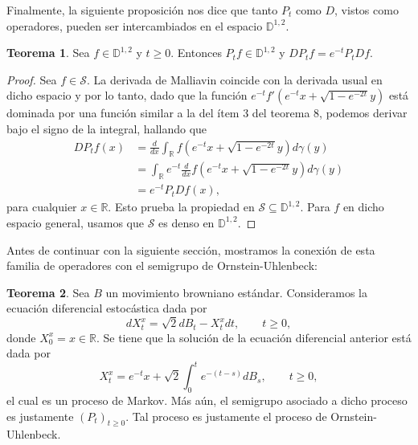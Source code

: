 \documentclass[letterpaper,twoside,12pt]{book}
\newcommand{\R}{\mathbb{R}}
\newcommand{\D}{\mathbb{D}}
\renewcommand{\S}{\mathcal{S}}
\newcommand{\1}{\mathds{1}}
\theoremstyle{definition}
\theoremstyle{definition}
\newtheorem{teo}{Teorema}
\theoremstyle{definition}
\theoremstyle{definition}
\theoremstyle{definition}
\theoremstyle{definition}
\theoremstyle{definition}
\begin{document}
 Finalmente, la siguiente proposición nos dice que tanto $P_t$ como $D$, vistos como operadores, pueden ser intercambiados en el espacio $\mathbb{D}^{1,2}$.
 \begin{teo} 
  Sea $f\in \D^{1,2}$ y $t\geq0$. Entonces $P_tf\in \D^{1,2}$ y $DP_tf=e^{-t}P_tDf$.
  \end{teo}
  \begin{proof} 
    Sea $f\in \S$. La derivada de Malliavin coincide con la derivada usual en dicho espacio y por lo tanto, dado que la función $e^{-t}f' \left(e^{-t}x+\sqrt{1-e^{-2t}}y\right)$ está dominada por una función similar a la del ítem 3 del teorema 8, podemos derivar bajo el signo de la integral, hallando que
    \begin{align*}
        DP_tf(x)&=\frac{d}{dx}\int_\R f \left(e^{-t}x+\sqrt{1-e^{-2t}}y\right)d\gamma(y)\\
        &=\int_\R e^{-t}\frac{d}{dx}f\left(e^{-t}x+\sqrt{1-e^{-2t}}y\right)d\gamma(y)\\
        &=e^{-t}P_t Df(x),
    \end{align*}
    para cualquier $x\in \R$. Esto prueba la propiedad en $\S\subseteq \D^{1,2}$. Para $f$ en dicho espacio general, usamos que $\S$ es denso en $\D^{1,2}$.
   \end{proof}
   Antes de continuar con la siguiente sección, mostramos la conexión de esta familia de operadores con el semigrupo de Ornstein-Uhlenbeck:
   \begin{teo} 
    Sea $B$ un movimiento browniano estándar. Consideramos la ecuación diferencial estocástica dada por 
    \[
    dX_t^{x}=\sqrt{2}dB_t-X^{x}_tdt, \qquad t\geq0,
    \]
    donde $X^{x}_0=x\in \R$. Se tiene que la solución de la ecuación diferencial anterior está dada por 
    \[
    X_t^x=e^{-t}x+\sqrt{2}\int_0^te^{-(t-s)}dB_s, \qquad t\geq0,
    \]
    el cual es un proceso de Markov. Más aún, el semigrupo asociado a dicho proceso es justamente $(P_t)_{t\geq0}$. Tal proceso es justamente el proceso de Ornstein-Uhlenbeck.
    \end{teo}
\end{document}
